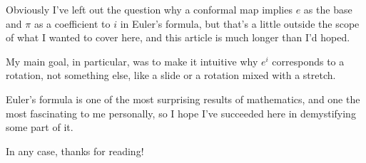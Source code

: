 \documentclass[11pt, oneside]{article}   	%
\begin{document}
Obviously I've left out the question why a conformal map implies $e$ as the base and $\pi$ as a coefficient to $i$ in Euler's formula, but that's a little outside the scope of what I wanted to cover here, and this article is much longer than I'd hoped. 

My main goal, in particular, was to make it intuitive why $e^i$ corresponds to a rotation, not something else, like a slide or a rotation mixed with a stretch.

Euler's formula is one of the most surprising results of mathematics, and one the most fascinating to me personally, so I hope I've succeeded here in demystifying some part of it.

In any case, thanks for reading!
\end{document}
